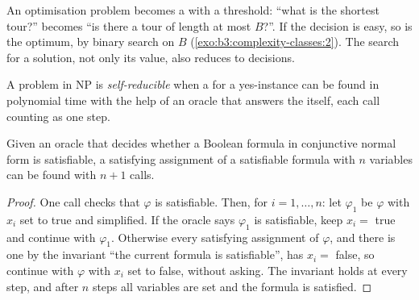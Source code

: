 \begin{omfigure}
\par{}
\end{omfigure}

An optimisation problem becomes a  with a threshold: ``what is the shortest tour?'' becomes ``is there a tour of length at most $B$?''. If the decision is easy, so is the optimum, by binary search on $B$ (\cref{exo:b3:complexity-classes:2}). The search for a solution, not only its value, also reduces to decisions.

\begin{definition}\label{def:b3:complexity-classes:self-reducibility}
A problem in NP is \emph{self-reducible} when a  for a yes-instance can be found in polynomial time with the help of an oracle that answers the  itself, each call counting as one step.
\end{definition}

\begin{theorem}\label{thm:b3:complexity-classes:self-reduce}
Given an oracle that decides whether a Boolean formula in conjunctive normal form is satisfiable, a satisfying assignment of a satisfiable formula with $n$ variables can be found with $n + 1$ calls.
\end{theorem}

\begin{proof}
One call checks that $\varphi$ is satisfiable. Then, for $i = 1, \ldots, n$: let $\varphi_1$ be $\varphi$ with $x_i$ set to true and simplified. If the oracle says $\varphi_1$ is satisfiable, keep $x_i = $ true and continue with $\varphi_1$. Otherwise every satisfying assignment of $\varphi$, and there is one by the invariant ``the current formula is satisfiable'', has $x_i = $ false, so continue with $\varphi$ with $x_i$ set to false, without asking. The invariant holds at every step, and after $n$ steps all variables are set and the formula is satisfied.
\end{proof}

